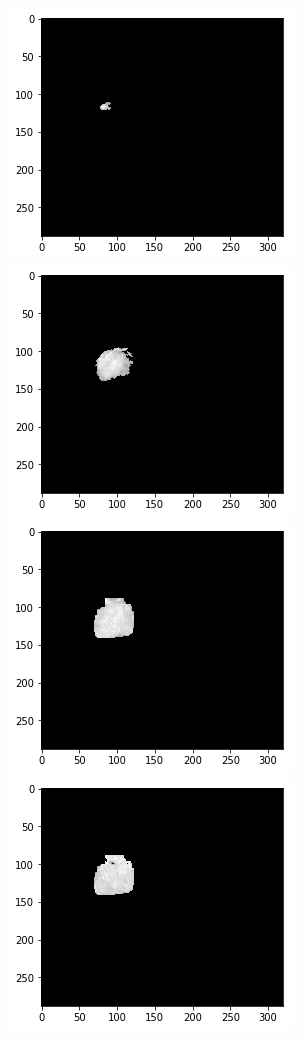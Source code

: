 \documentclass[conference]{IEEEtran}
\begin{document}
\begin{figure}
\begin{center}
\includegraphics[scale=0.4]{img/1.png} 
\includegraphics[scale=0.4]{img/2.png}\\
\includegraphics[scale=0.4]{img/3.png} 
\includegraphics[scale=0.4]{img/4.png} \\

\end{center}
\end{figure}
\end{document}
